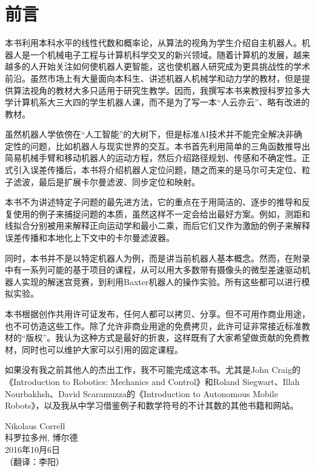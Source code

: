 \chapter*{前言}
本书利用本科水平的线性代数和概率论，从算法的视角为学生介绍自主机器人。机器人是一个机械电子工程与计算机科学交叉的新兴领域。随着计算机的发展，越来越多的人开始关注如何使机器人更智能，这也使机器人研究成为更具挑战性的学术前沿。虽然市场上有大量面向本科生、讲述机器人机械学和动力学的教材，但是提供算法视角的教材大多只适用于研究生教学。因而，我撰写本书来教授科罗拉多大学计算机系大三大四的学生机器人课，而不是为了写一本“人云亦云”、略有改进的教材。

虽然机器人学依傍在“人工智能”的大树下，但是标准AI技术并不能完全解决非确定性的问题，比如机器人与现实世界的交互。本书首先利用简单的三角函数推导出简易机械手臂和移动机器人的运动方程，然后介绍路径规划、传感和不确定性。正式引入误差传播后，本书将介绍机器人定位问题，随之而来的是马尔可夫定位、粒子滤波，最后是扩展卡尔曼滤波、同步定位和映射。

本书不为讲述特定子问题的最先进方法，它的重点在于用简洁的、逐步的推导和反复使用的例子来捕捉问题的本质，虽然这样不一定会给出最好方案。例如，测距和线拟合分别被用来解释正向运动学和最小二乘，而后它们又作为激励的例子来解释误差传播和本地化上下文中的卡尔曼滤波器。

同时，本书并不是以特定机器人为例，而是讲当前机器人基本概念。然而，在附录中有一系列可能的基于项目的课程，从可以用大多数带有摄像头的微型差速驱动机器人实现的解迷宫竞赛，到利用Baxter机器人的操作实验。所有这些都可以进行模拟实验。

本书根据创作共用许可证发布，任何人都可以拷贝、分享。但不可用作商业用途，也不可仿造这些工作。除了允许非商业用途的免费拷贝，此许可证非常接近标准教材的“版权”。我认为这种方式是最好的折衷，这样既有了大家希望做贡献的免费教材，同时也可以维护大家可以引用的固定课程。

如果没有我之前其他人的杰出工作，我不可能完成这本书。尤其是John Craig的《Introduction to Robotics: Mechanics and Control》和Roland Siegwart、Illah Nourbakhsh、David Scaramuzza的《Introduction to Autonomous Mobile Robots》，以及我从中学习借鉴例子和数学符号的不计其数的其他书籍和网站。


\begin{flushright}
Nikolaus Correll\\
科罗拉多州, 博尔德\\
2016年10月6日\\
（翻译：李阳）
\end{flushright}